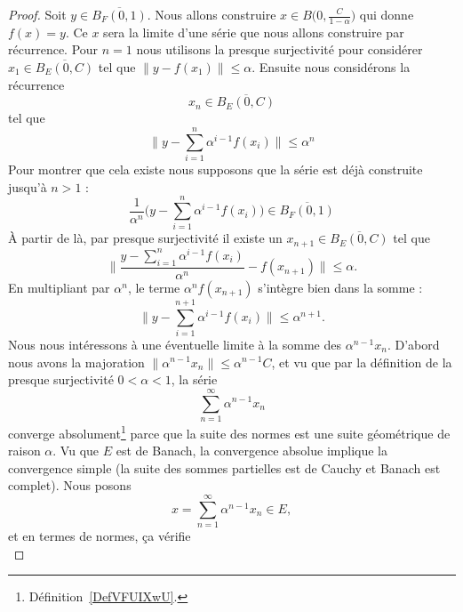 \begin{proof}
	Soit \( y\in \overline{ B_F(0,1) }\). Nous allons construire \( x\in B\big( 0,\frac{ C }{ 1-\alpha } \big)\) qui donne \( f(x)=y\). Ce \( x\) sera la limite d'une série que nous allons construire par récurrence. Pour \( n=1\) nous utilisons la presque surjectivité pour considérer \( x_1\in\overline{ B_E(0,C) } \) tel que \( \| y-f(x_1) \|\leq \alpha\). Ensuite nous considérons la récurrence
	\begin{equation}
		x_n\in \overline{ B_E(0,C) }
	\end{equation}
	tel que
	\begin{equation}
		\big\| y-\sum_{i=1}^n\alpha^{i-1}f(x_i) \big\|\leq \alpha^n
	\end{equation}
	Pour montrer que cela existe nous supposons que la série est déjà construite jusqu'à \( n>1\) :
	\begin{equation}
		\frac{1}{ \alpha^n }\Big( y-\sum_{i=1}^n\alpha^{i-1}f(x_i) \Big)\in \overline{ B_F(0,1) }
	\end{equation}
	À partir de là, par presque surjectivité il existe un \( x_{n+1}\in \overline{ B_E(0,C) }\) tel que
	\begin{equation}
		\big\| \frac{ y-\sum_{i=1}^n\alpha^{i-1}f(x_i) }{ \alpha^n }-f(x_{n+1}) \big\|\leq \alpha.
	\end{equation}
	En multipliant par \( \alpha^{n}\), le terme \( \alpha^nf(x_{n+1})\) s'intègre bien dans la somme :
	\begin{equation}
		\big\| y-\sum_{i=1}^{n+1}\alpha^{i-1}f(x_i) \big\|\leq \alpha^{n+1}.
	\end{equation}
	Nous nous intéressons à une éventuelle limite à la somme des \( \alpha^{n-1}x_n\). D'abord nous avons la majoration \( \| \alpha^{n-1}x_n \|\leq \alpha^{n-1}C\), et vu que par la définition de la presque surjectivité \( 0<\alpha<1\), la série
	\begin{equation}
		\sum_{n=1}^{\infty}\alpha^{n-1}x_n
	\end{equation}
	converge absolument\footnote{Définition~\ref{DefVFUIXwU}.} parce que la suite des normes est une suite géométrique de raison \( \alpha\). Vu que \( E\) est de Banach, la convergence absolue implique la convergence simple (la suite des sommes partielles est de Cauchy et Banach est complet). Nous posons
	\begin{equation}
		x=\sum_{n=1}^{\infty}\alpha^{n-1}x_n\in E,
	\end{equation}
	et en termes de normes, ça vérifie
	\begin{equation}

\end{equation}
\end{proof}
